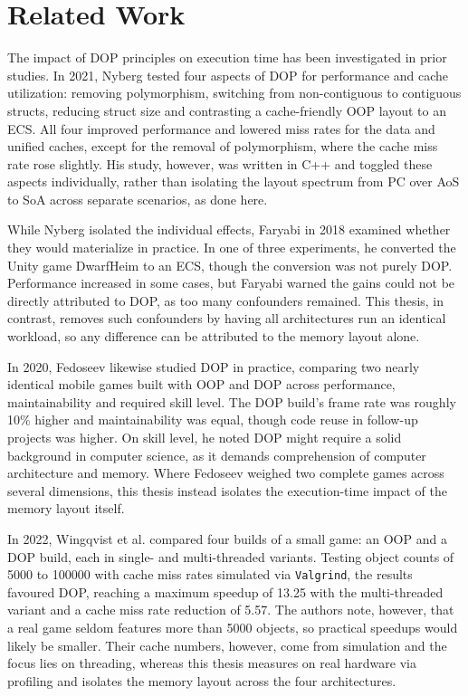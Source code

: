  
\cleardoubleoddpage
\chapter{Related Work}
\label{sec:related-work}
The impact of \ac{DOP} principles on execution time has been investigated in prior studies. In 2021, Nyberg \cite{nyberg2021dod} tested four aspects of \ac{DOP} for performance and cache utilization: removing polymorphism, switching from non-contiguous to contiguous structs, reducing struct size and contrasting a cache-friendly \ac{OOP} layout to an \ac{ECS}. All four improved performance and lowered miss rates for the data and unified caches, except for the removal of polymorphism, where the cache miss rate rose slightly. His study, however, was written in C++ and toggled these aspects individually, rather than isolating the layout spectrum from \ac{PC} over \ac{AoS} to \ac{SoA} across separate  scenarios, as done here.

While Nyberg isolated the individual effects, Faryabi \cite{faryabi2018dataoriented} in 2018 examined whether they would materialize in practice. In one of three experiments, he converted the Unity game DwarfHeim to an \ac{ECS}, though the conversion was not purely \ac{DOP}. Performance increased in some cases, but Faryabi warned the gains could not be directly attributed to \ac{DOP}, as too many confounders remained. This thesis, in contrast, removes such confounders by having all architectures run an identical workload, so any difference can be attributed to the memory layout alone.

In 2020, Fedoseev \cite{fedoseev2020application} likewise studied \ac{DOP} in practice, comparing two nearly identical mobile games built with \ac{OOP} and \ac{DOP} across performance, maintainability and required skill level. The \ac{DOP} build's frame rate was roughly \num{10}\% higher and maintainability was equal, though code reuse in follow-up projects was higher. On skill level, he noted \ac{DOP} might require a solid background in computer science, as it demands comprehension of computer architecture and memory. Where Fedoseev weighed two complete games across several dimensions, this thesis instead isolates the execution-time impact of the memory layout itself.

\clearpage
In 2022, Wingqvist et al. \cite{wingqvist2022evaluating} compared four builds of a small game: an \ac{OOP} and a \ac{DOP} build, each in single- and multi-threaded variants. Testing object counts of \num{5000} to \num{100000} with cache miss rates simulated via \texttt{Valgrind}, the results favoured \ac{DOP}, reaching a maximum speedup of \num{13.25} with the multi-threaded variant and a cache miss rate reduction of \num{5.57}. The authors note, however, that a real game seldom features more than \num{5000} objects, so practical speedups would likely be smaller. Their cache numbers, however, come from simulation and the focus lies on threading, whereas this thesis measures on real hardware via profiling and isolates the memory layout across the four architectures.


